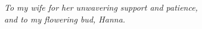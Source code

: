 \documentclass{altmsuphddissertation}
\begin{document}



\begin{dedication}
\centering
{\it
To my wife for her unwavering support and patience,\\
and to my flowering bud, Hanna. 
}
\end{dedication}
\end{document}
